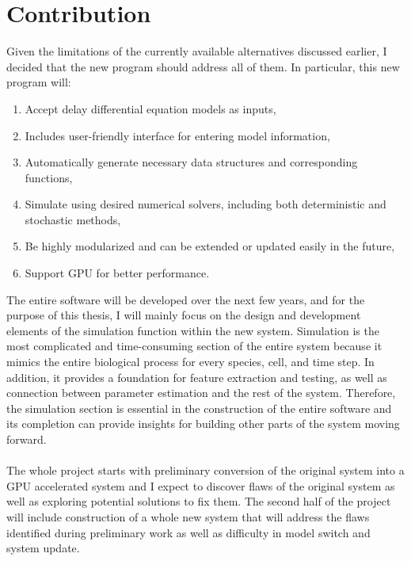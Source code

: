 \documentclass[../thesis.tex]{subfiles}
\begin{document}
\chapter{Contribution}
\label{ch:pruning}
Given the limitations of the currently available alternatives discussed earlier, I decided that the new program should address all of them. In particular, this new program will: \\
\begin{enumerate}
	\item Accept delay differential equation models as inputs,
	\item Includes user-friendly interface for entering model information,
	\item Automatically generate necessary data structures and corresponding functions,
	\item Simulate using desired numerical solvers, including both deterministic and stochastic methods,
	\item Be highly modularized and can be extended or updated easily in the future,
	\item Support GPU for better performance.\\
\end{enumerate}

The entire software will be developed over the next few years, and for the purpose of this thesis, I will mainly focus on the design and development elements of the simulation function within the new system. Simulation is the most complicated and time-consuming section of the entire system because it mimics the entire biological process for every species, cell, and time step. In addition, it provides a foundation for feature extraction and testing, as well as connection between parameter estimation and the rest of the system. Therefore, the simulation section is essential in the construction of the entire software and its completion can provide insights for building other parts of the system moving forward. \\
\\
The whole project starts with preliminary conversion of the original system into a GPU accelerated system and I expect to discover flaws of the original system as well as exploring potential solutions to fix them. The second half of the project will include construction of a whole new system that will address the flaws identified during preliminary work as well as difficulty in model switch and system update.
\end{document}
